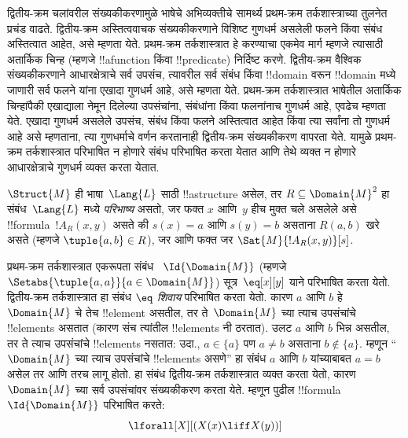 \documentclass[../../../include/open-logic-section]{subfiles}
\begin{document}

\begin{explain}
द्वितीय-क्रम
चलांवरील
संख्यकीकरणामुळे
भाषेचे अभिव्यक्तीचे
सामर्थ्य प्रथम-क्रम
तर्कशास्त्राच्या
तुलनेत प्रचंड
वाढते.
द्वितीय-क्रम
अस्तित्ववाचक
संख्यकीकरणाने
विशिष्ट गुणधर्म
असलेली फलने
किंवा संबंध
अस्तित्वात आहेत,
असे म्हणता येते.
प्रथम-क्रम
तर्कशास्त्रात
हे करण्याचा
एकमेव मार्ग
म्हणजे त्यासाठी
अतार्किक चिन्ह
(म्हणजे !!a{function}
किंवा !!{predicate})
निर्दिष्ट करणे.
द्वितीय-क्रम
वैश्विक संख्यकीकरणाने
आधारक्षेत्राचे
सर्व उपसंच,
त्यावरील सर्व
संबंध किंवा
!!{domain} वरून
!!{domain} मध्ये
जाणारी सर्व
फलने यांना
एखादा गुणधर्म
आहे, असे
म्हणता येते.
प्रथम-क्रम
तर्कशास्त्रात
भाषेतील अतार्किक
चिन्हांपैकी
एखाद्याला
नेमून दिलेल्या
उपसंचांना,
संबंधांना किंवा
फलनांनाच
गुणधर्म आहे,
एवढेच म्हणता
येते.
एखादा गुणधर्म
असलेले उपसंच,
संबंध किंवा
फलने अस्तित्वात
आहेत किंवा
त्या सर्वांना
तो गुणधर्म
आहे असे म्हणताना,
त्या गुणधर्माचे
वर्णन करतानाही
द्वितीय-क्रम
संख्यकीकरण
वापरता येते.
यामुळे प्रथम-क्रम
तर्कशास्त्रात
परिभाषित न
होणारे संबंध
परिभाषित करता
येतात आणि
तेथे व्यक्त न
होणारे आधारक्षेत्राचे
गुणधर्म व्यक्त
करता येतात.
\end{explain}

\begin{defn}
$\Struct{M}$ ही
भाषा~$\Lang{L}$
साठी !!a{structure}
असेल, तर
$R \subseteq \Domain{M}^2$
हा संबंध~$\Lang{L}$
मध्ये \emph{परिभाष्य}
असतो, जर फक्त
$x$ आणि~$y$
हीच मुक्त चले
असलेले असे
!!{formula}~$!A_R(x, y)$
असते की
$s(x) = a$
आणि $s(y) = b$
असताना
$R(a, b)$
खरे असते
(म्हणजे
$\tuple{a,b} \in R$),
जर आणि फक्त
जर
$\Sat{M}{!A_R(x, y)}[s]$.
\end{defn}

\begin{ex}
प्रथम-क्रम
तर्कशास्त्रात
एकरूपता संबंध~
$\Id{\Domain{M}}$
(म्हणजे
$\Setabs{\tuple{a,a}}{a \in
  \Domain{M}}$)
सूत्र~$\eq[x][y]$
याने परिभाषित
करता येतो.
द्वितीय-क्रम
तर्कशास्त्रात
हा संबंध
\emph{$\eq$ शिवाय}
परिभाषित
करता येतो.
कारण $a$
आणि $b$
हे~$\Domain{M}$
चे तेच
!!{element}
असतील, तर
ते~$\Domain{M}$
च्या त्याच
उपसंचांचे
!!{element}s
असतात (कारण
संच त्यांतील
!!{element}s
नी ठरतात).
उलट $a$
आणि $b$
भिन्न असतील,
तर ते त्याच
उपसंचांचे
!!{element}s
नसतात:
उदा.,
$a \in \{a\}$
पण $a \neq b$
असताना
$b
\notin \{a\}$.
म्हणून
“~$\Domain{M}$
च्या त्याच
उपसंचांचे
!!{element}s
असणे” हा
संबंध $a$
आणि $b$
यांच्याबाबत
$a = b$
असेल तर आणि
तरच लागू
होतो.
हा संबंध
द्वितीय-क्रम
तर्कशास्त्रात
व्यक्त करता
येतो, कारण
~$\Domain{M}$
च्या सर्व
उपसंचांवर
संख्यकीकरण
करता येते.
म्हणून पुढील
!!{formula}
$\Id{\Domain{M}}$
परिभाषित करते:
\[
\lforall[X][(X(x) \liff X(y))]
\]
\end{ex}
\end{document}
